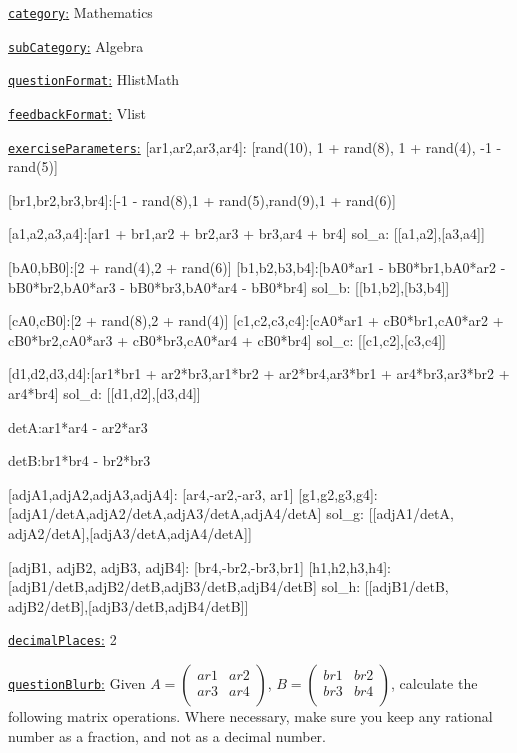 \documentclass[preview]{standalone}
\newcommand \fieldname[1]{\underline{\texttt{#1}:}}
\begin{document}
\fieldname{category}  %
Mathematics

\fieldname{subCategory} %
Algebra

\fieldname{questionFormat}
HlistMath

\fieldname{feedbackFormat}
Vlist

\fieldname{exerciseParameters}
[ar1,ar2,ar3,ar4]: [rand(10), 1 + rand(8), 1 + rand(4), -1 - rand(5)]

[br1,br2,br3,br4]:[-1 - rand(8),1 + rand(5),rand(9),1 + rand(6)]

[a1,a2,a3,a4]:[ar1 + br1,ar2 + br2,ar3 + br3,ar4 + br4]
sol_a: [[a1,a2],[a3,a4]]

[bA0,bB0]:[2 + rand(4),2 + rand(6)]
[b1,b2,b3,b4]:[bA0*ar1 - bB0*br1,bA0*ar2 - bB0*br2,bA0*ar3 - bB0*br3,bA0*ar4 - bB0*br4]
sol_b: [[b1,b2],[b3,b4]]

[cA0,cB0]:[2 + rand(8),2 + rand(4)]
[c1,c2,c3,c4]:[cA0*ar1 + cB0*br1,cA0*ar2 + cB0*br2,cA0*ar3 + cB0*br3,cA0*ar4 + cB0*br4]
sol_c: [[c1,c2],[c3,c4]]

[d1,d2,d3,d4]:[ar1*br1 + ar2*br3,ar1*br2 + ar2*br4,ar3*br1 + ar4*br3,ar3*br2 + ar4*br4]
sol_d: [[d1,d2],[d3,d4]]

detA:ar1*ar4 - ar2*ar3

detB:br1*br4 - br2*br3

[adjA1,adjA2,adjA3,adjA4]: [ar4,-ar2,-ar3, ar1]
[g1,g2,g3,g4]:[adjA1/detA,adjA2/detA,adjA3/detA,adjA4/detA]
sol_g: [[adjA1/detA, adjA2/detA],[adjA3/detA,adjA4/detA]]

[adjB1, adjB2, adjB3, adjB4]: [br4,-br2,-br3,br1]
[h1,h2,h3,h4]:[adjB1/detB,adjB2/detB,adjB3/detB,adjB4/detB]
sol_h: [[adjB1/detB, adjB2/detB],[adjB3/detB,adjB4/detB]]


\fieldname{decimalPlaces}
2

\fieldname{questionBlurb}
Given \(A=\left( {\begin{array}{cc}
   {ar1} & {ar2} \\
   {ar3} & {ar4} \\
 \end{array} } \right) \), \(B=\left( {\begin{array}{cc}
     {br1} & {br2} \\
     {br3} & {br4} \\
    \end{array} } \right) \), calculate the following matrix operations. Where necessary, make sure you keep any rational number as a fraction, and not as a decimal number.
\end{document}
